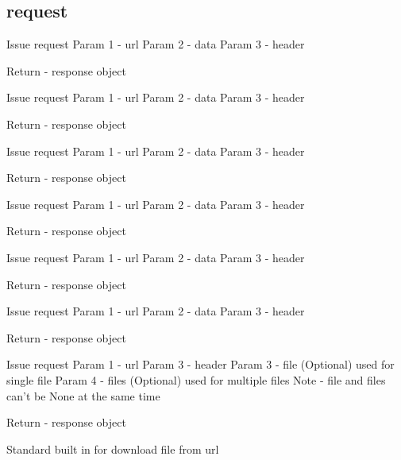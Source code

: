 \subsection{request}
{Issue request
Param 1 - url
Param 2 - data
Param 3 - header

Return - response object}
{Issue request
Param 1 - url
Param 2 - data
Param 3 - header

Return - response object}
{Issue request
Param 1 - url
Param 2 - data
Param 3 - header

Return - response object}
{Issue request
Param 1 - url
Param 2 - data
Param 3 - header

Return - response object}
{Issue request
Param 1 - url
Param 2 - data
Param 3 - header

Return - response object}
{Issue request
Param 1 - url
Param 2 - data
Param 3 - header

Return - response object}
{Issue request
Param 1 - url
Param 3 - header
Param 3 - file (Optional) used for single file
Param 4 - files (Optional) used for multiple files
Note - file and files can't be None at the same time

Return - response object}
{Standard built in for download file from url}
